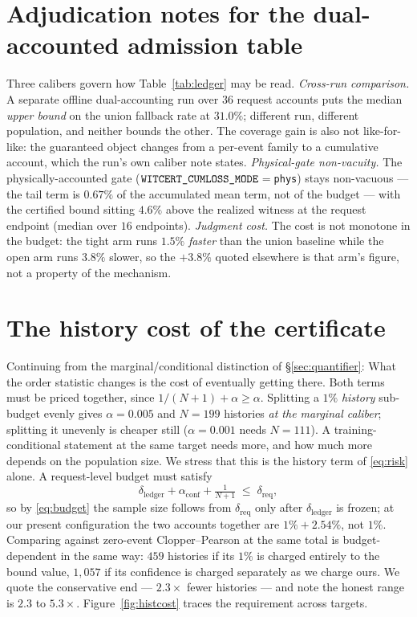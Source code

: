 \documentclass[11pt]{article}
\renewcommand{\_}{\WCorigunderscore\allowbreak}
\begin{document}
\section{Adjudication notes for the dual-accounted admission table}
\label{app:ledgernotes}
Three calibers govern how Table~\ref{tab:ledger} may be read.
\emph{Cross-run comparison.} A separate offline dual-accounting run over
$36$ request accounts puts the median \emph{upper bound} on the union
fallback rate at $31.0\%$; different run, different population, and
neither bounds the other. The coverage gain is also not like-for-like:
the guaranteed object changes from a per-event family to a cumulative
account, which the run's own caliber note states.
\emph{Physical-gate non-vacuity.} The physically-accounted gate
($\texttt{WITCERT\_CUMLOSS\_MODE}$$=$\texttt{phys}) stays non-vacuous ---
the tail term is $0.67\%$ of the accumulated mean term, not of the
budget --- with the certified bound sitting $4.6\%$ above the realized
witness at the request endpoint (median over $16$ endpoints).
\emph{Judgment cost.} The cost is not monotone in the budget: the tight
arm runs $1.5\%$ \emph{faster} than the union baseline while the open
arm runs $3.8\%$ slower, so the $+3.8\%$ quoted elsewhere is that arm's
figure, not a property of the mechanism.

\section{The history cost of the certificate}
\label{app:histcost}

Continuing from the marginal/conditional distinction of \S\ref{sec:quantifier}: What the order statistic changes is the
cost of eventually getting there. Both terms must be
priced together, since $1/(N+1)+\alpha\ge\alpha$. Splitting a $1\%$
\emph{history} sub-budget evenly gives $\alpha=0.005$ and $N=199$
histories \emph{at the marginal caliber}; splitting it unevenly is
cheaper still ($\alpha=0.001$ needs $N=111$). A training-conditional
statement at the same target needs more, and how much more depends on
the population size. We stress that this is the history term of \eqref{eq:risk}
alone. A request-level budget must satisfy
\begin{equation}\label{eq:budget}
  \delta_{\mathrm{ledger}}+\alpha_{\mathrm{conf}}+\tfrac{1}{N+1}
  \;\le\;\delta_{\mathrm{req}},
\end{equation}
so by \eqref{eq:budget} the sample size follows from
$\delta_{\mathrm{req}}$ only after $\delta_{\mathrm{ledger}}$ is frozen;
at our present configuration the two accounts together are
$1\%+2.54\%$, not $1\%$. Comparing
against zero-event Clopper--Pearson at the same total is
budget-dependent in the same way: $459$ histories if its $1\%$ is
charged entirely to the bound value, $1{,}057$ if its confidence is
charged separately as we charge ours. We quote the conservative
end --- $2.3\times$ fewer histories --- and note the honest range is
$2.3$ to $5.3\times$. Figure~\ref{fig:histcost} traces the requirement
across targets.
\end{document}
